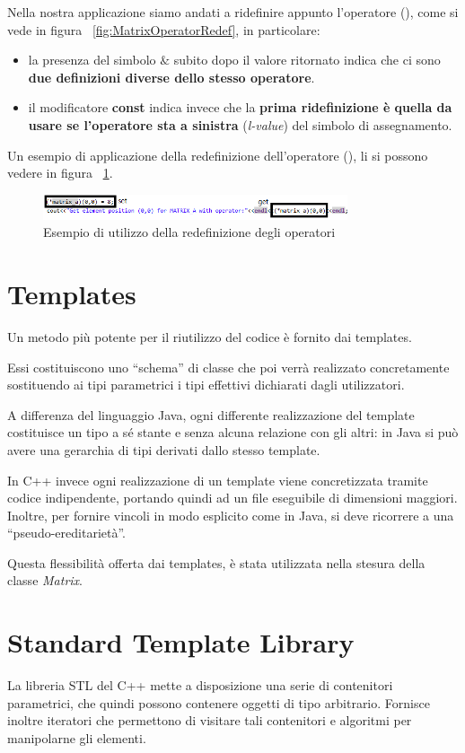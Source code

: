 Nella nostra applicazione siamo andati a ridefinire appunto l'operatore (), come si vede in figura ~\ref{fig:MatrixOperatorRedef}, in particolare:
\begin{itemize}
	\item  la presenza del simbolo \textbf{$\&$} subito dopo il valore ritornato indica che ci sono\textbf{ due definizioni diverse dello stesso operatore}.
	\item il modificatore \textbf{const} indica invece che la\textbf{ prima ridefinizione è quella da usare se l'operatore sta a sinistra} (\textit{l-value}) del simbolo di assegnamento.
\end{itemize}
Un esempio di applicazione della redefinizione dell'operatore (), li si possono vedere in figura ~\ref{fig:OperatorExamples}.

\begin{figure}[h]
	\centering
	\includegraphics[width=0.8\textwidth]{Immagini/OperatorExample.png}
	\caption{Esempio di utilizzo della redefinizione degli operatori}
	\label{fig:OperatorExamples}
\end{figure}

\section{Templates}
Un metodo più potente per il riutilizzo del codice è fornito dai templates. 

Essi costituiscono uno “schema” di classe che poi verrà realizzato concretamente sostituendo ai tipi parametrici i tipi effettivi dichiarati dagli utilizzatori.

A differenza del linguaggio Java, ogni differente realizzazione del template costituisce un tipo
a sé stante e senza alcuna relazione con gli altri: in Java si può avere una gerarchia di tipi
derivati dallo stesso template.

In C++ invece ogni realizzazione di un template viene concretizzata tramite codice
indipendente, portando quindi ad un file eseguibile di dimensioni maggiori. Inoltre, per fornire
vincoli in modo esplicito come in Java, si deve ricorrere a una “pseudo-ereditarietà”.

Questa flessibilità offerta dai templates, è stata utilizzata nella stesura della classe \textit{Matrix}.

\section{Standard Template Library}
La libreria STL del C++ mette a disposizione una serie di contenitori parametrici, che quindi
possono contenere oggetti di tipo arbitrario. Fornisce inoltre iteratori che permettono di visitare
tali contenitori e algoritmi per manipolarne gli elementi.

